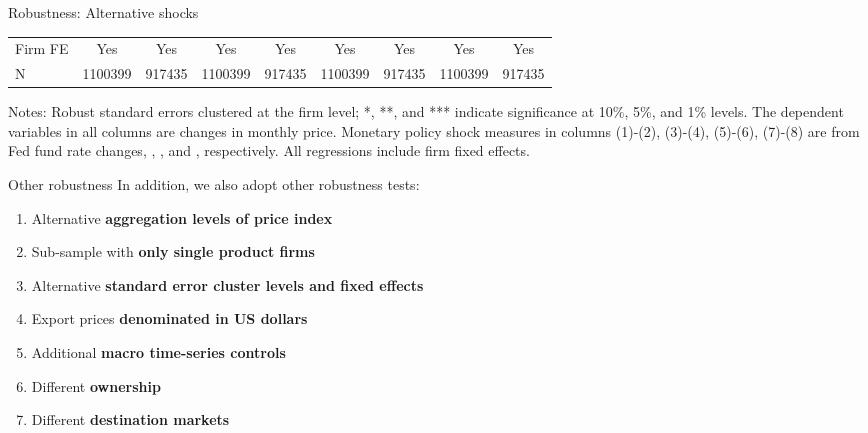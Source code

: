 \documentclass[10pt]{beamer}
\begin{document}
\begin{frame}{Robustness: Alternative shocks}
\begin{table}[htbp]
{\begin{threeparttable}
\begin{tabular}{lcccccccc}
            \midrule
            Firm FE & Yes   & Yes   & Yes   & Yes   & Yes   & Yes   & Yes   & Yes \\
            N     & 1100399 & 917435 & 1100399 & 917435 & 1100399 & 917435 & 1100399 & 917435 \\
            \bottomrule
        \end{tabular}
            \begin{tablenotes}
                \footnotesize
                \item Notes: Robust standard errors clustered at the firm level;  *, **, and *** indicate significance at 10\%, 5\%, and 1\% levels. The dependent variables in all columns are changes in monthly price. Monetary policy shock measures in columns (1)-(2), (3)-(4), (5)-(6), (7)-(8) are from Fed fund rate changes, \cite{nakamura2018high}, \cite{acosta2022perceived}, and \cite{jarocinski2020deconstructing}, respectively. All regressions include firm fixed effects.
    	\end{tablenotes}
        \end{threeparttable}
        }
        \label{tab.altmps}
    \end{table}
\end{frame}

\begin{frame}[label=robustness_other]{Other robustness}
    In addition, we also adopt other robustness tests:
    \medskip
    \begin{enumerate}
        \item Alternative \textbf{aggregation levels of price index} \hyperlink{tab.altagg}{}
        \item Sub-sample with \textbf{only single product firms} \hyperlink{tab.single}{}
        \item Alternative \textbf{standard error cluster levels and fixed effects} \hyperlink{tab.altfe}{}
        \item Export prices \textbf{denominated in US dollars} \hyperlink{tab.USD}{}
        \item Additional \textbf{macro time-series controls} \hyperlink{tab.macro_control} {}
        \item Different \textbf{ownership} \hyperlink{tab.ownership} {}
        \item Different \textbf{destination markets} \hyperlink{fig.top20} {}
    \end{enumerate}
\end{frame}
\end{document}
